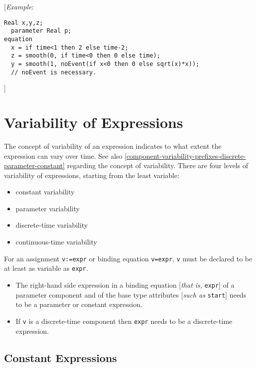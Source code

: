 {[}\emph{Example}:
\begin{lstlisting}[language=modelica]
  Real x,y,z;
  parameter Real p;
equation
  x = if time<1 then 2 else time-2;
  z = smooth(0, if time<0 then 0 else time);
  y = smooth(1, noEvent(if x<0 then 0 else sqrt(x)*x));
  // noEvent is necessary.
\end{lstlisting}

{]}

\section{Variability of Expressions}

The concept of variability of an expression indicates to what extent the
expression can vary over time. See also \autoref{component-variability-prefixes-discrete-parameter-constant} regarding the
concept of variability. There are four levels of variability of
expressions, starting from the least variable:

\begin{itemize}
\item
  constant variability
\item
  parameter variability
\item
  discrete-time variability
\item
  continuous-time variability
\end{itemize}

For an assignment \lstinline[basicstyle=\ttfamily]!v:=expr! or binding equation \lstinline[basicstyle=\ttfamily]!v=expr!, \lstinline[basicstyle=\ttfamily]!v! must be declared
to be at least as variable as \lstinline[basicstyle=\ttfamily]!expr!.

\begin{itemize}
\item
  The right-hand side expression in a binding equation {[}\emph{that is,}
  \lstinline[basicstyle=\ttfamily]!expr!{]} of a parameter component and of the base type attributes
  {[}\emph{such as} \lstinline[basicstyle=\ttfamily]!start!{]} needs to be a parameter or constant
  expression.
\item
  If \lstinline[basicstyle=\ttfamily]!v! is a discrete-time component then \lstinline[basicstyle=\ttfamily]!expr! needs to be a
  discrete-time expression.
\end{itemize}

\subsection{Constant Expressions}

